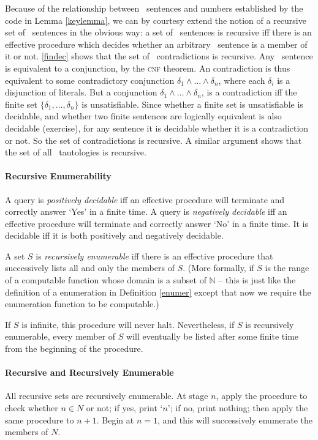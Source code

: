 Because of the relationship between \lone\ sentences and numbers established by the code in Lemma \ref{keylemma}, we can by courtesy extend the notion of a recursive set of \lone\ sentences in the obvious way: a set of \lone\ sentences is recursive iff there is an effective procedure which decides whether an arbitrary \lone\ sentence is a member of it or not. \autoref{findec} shows that the set of \lone\ contradictions is recursive. Any \lone\ sentence is equivalent to a conjunction, by the \textsc{cnf} theorem. An contradiction is thus equivalent to some contradictory conjunction $\delta_{1}\wedge…\wedge \delta_{n}$, where each $\delta_{i}$ is a disjunction of literals. But a conjunction $\delta_{1}\wedge…\wedge \delta_{n}$, is a contradiction iff the finite set $\{\delta_{1},…, \delta_{n}\}$ is unsatisfiable. Since whether a finite set is unsatisfiable is decidable, and whether two finite sentences are logically equivalent is also decidable (exercise), for any sentence it is decidable whether it is a contradiction or not. So the set of contradictions is recursive. A similar argument shows that the set of all \lone\ tautologies is recursive.  




\paragraph{Recursive Enumerability} A query is \emph{positively decidable} iff an effective procedure will terminate and correctly answer `Yes' in a finite time. A query is \emph{negatively decidable} iff an effective procedure will terminate and correctly answer `No' in a finite time. It is decidable iff it is both positively and negatively decidable.

\begin{definition}
	A set $S$ is \emph{recursively enumerable} iff there is an effective procedure that successively lists all and only the members of $S$. (More formally, if $S$ is the range of a computable function whose domain is a subset of $\mathbb{N}$ – this is just like the definition of a enumeration in Definition \ref{enumer} except that now we require the enumeration function to be computable.)
\end{definition} If $S$ is infinite, this procedure will never halt. Nevertheless, if $S$ is recursively enumerable, every member of $S$ will eventually be listed after some finite time from the beginning of the procedure. 

\paragraph{Recursive and Recursively Enumerable} All recursive sets are recursively enumerable. At stage $n$, apply the procedure to check whether $n\in N$ or not; if yes, print `$n$'; if no, print nothing; then apply the same procedure to $n+1$. Begin at $n=1$, and this will successively enumerate the members of $N$.

